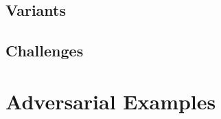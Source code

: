 \documentclass[13pt,compress]{beamer}
\begin{document}
\subsection{Variants}
 
\subsection{Challenges}
 
\section{Adversarial Examples}
 
\end{document}
